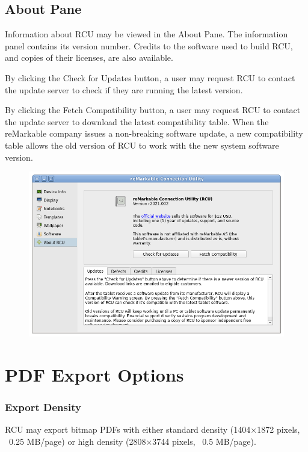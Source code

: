 \documentclass{memoir}
\begin{document}
{\newpage
\section{About Pane}
\label{sec:aboutpane}
Information about RCU may be viewed in the About Pane. The information panel contains its version number. Credits to the software used to build RCU, and copies of their licenses, are also available.

By clicking the Check for Updates button, a user may request RCU to contact the update server to check if they are running the latest version.

By clicking the Fetch Compatibility button, a user may request RCU to contact the update server to download the latest compatibility table. When the reMarkable company issues a non-breaking software update, a new compatibility table allows the old version of RCU to work with the new system software version.

\vfill
\begin{figure}[h]
  \centering
  \includegraphics[width=\linewidth]{images/about.png}
  \caption{}
  \label{fig:aboutpane}
\end{figure}



\newpage

\chapter{PDF Export Options}
\label{sec:render-samples}



\subsection{Export Density}
RCU may export bitmap PDFs with either standard density (1404$\times$1872 pixels, \break~0.25 MB/page) or high density (2808$\times$3744 pixels, ~0.5 MB/page).

}
\end{document}
